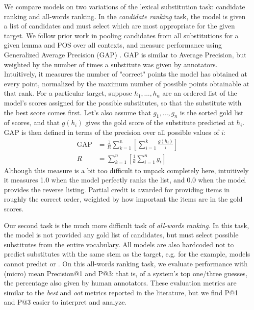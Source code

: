 We compare models on two variations of the lexical substitution task: candidate
ranking and all-words ranking. In the {\em candidate ranking} task, the model
is given a list of candidates and must select which are most appropriate for
the given target. We follow prior work in pooling candidates from all
substitutions for a given lemma and POS over all contexts, and measure
performance using Generalized Average Precision (GAP) \cite{kishida:2005:gap}.
GAP is similar to Average Precision, but weighted by the number of times a
substitute was given by annotators. Intuitively, it measures the number of
"correct" points the model has obtained at every point, normalized by the
maximum number of possible points obtainable at that rank.  For a particular
target, suppose $h_1,\ldots,h_n$ are an ordered list of the model's scores
assigned for the possible substitutes, so that the substitute with the best
score comes first. Let's also assume that $g_1,\ldots,g_n$ is the sorted gold
list of scores, and that $g(h_i)$  gives the gold score of the
substitute predicted at $h_i$. GAP is then defined in terms of the precision
over all possible values of $i$:
\begin{align*}
  \text{GAP} & = \frac{1}{R}\sum_{k=1}^n\left[\sum_{i=1}^k\frac{g(h_i)}{i}\right]\\
  R & = \sum_{k=1}^n\left[\frac{1}{k}\sum_{i=1}^n g_i\right]
\end{align*}
Although this measure is a bit too difficult to unpack completely here,
intuitively it measures 1.0 when the model perfectly ranks the list, and 0.0
when the model provides the reverse listing. Partial credit is awarded for
providing items in roughly the correct order, weighted by how important the
items are in the gold scores.

Our second task is the much more difficult task of {\em all-words ranking}. In
this task, the model is not provided any gold list of candidates, but must
select possible substitutes from the entire vocabulary. All models are also
hardcoded not to predict substitutes with the same stem as the target, e.g. for
the  example, models cannot predict  or
.
On this all-words ranking task, we evaluate performance with (micro) mean
Precision@1 and P@3: that is, of a system's top one/three guesses, the
percentage also given by human annotators.  These evaluation metrics are
similar to the {\em best} and {\em oot} metrics reported in the literature, but
we find P@1 and P@3 easier to interpret and analyze.

